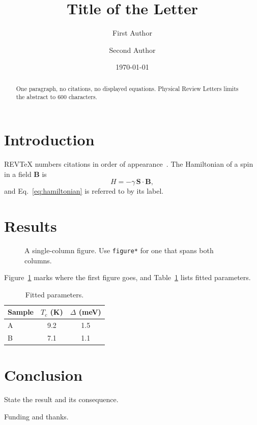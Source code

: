 \documentclass[aps,prl,reprint,superscriptaddress]{revtex4-2}
\begin{document}
\title{Title of the Letter}

\author{First Author}

\author{Second Author}

\date{\today}

\begin{abstract}
One paragraph, no citations, no displayed equations. Physical Review Letters
limits the abstract to 600 characters.
\end{abstract}

\maketitle

\section{Introduction}

REVTeX numbers citations in order of appearance~\cite{einstein1905}. The
Hamiltonian of a spin in a field $\bm{B}$ is
\begin{equation}
  H = -\gamma\, \bm{S} \cdot \bm{B},
  \label{eq:hamiltonian}
\end{equation}
and Eq.~\eqref{eq:hamiltonian} is referred to by its label.

\section{Results}

\begin{figure}[b]
  \caption{A single-column figure. Use \texttt{figure*} for one that spans
  both columns.}
  \label{fig:example}
\end{figure}

Figure~\ref{fig:example} marks where the first figure goes, and
Table~\ref{tab:values} lists fitted parameters.

\begin{table}[b]
  \caption{Fitted parameters.}
  \label{tab:values}
  \begin{ruledtabular}
    \begin{tabular}{lcc}
      Sample & $T_c$ (K) & $\Delta$ (meV) \\
      \hline
      A & 9.2 & 1.5 \\
      B & 7.1 & 1.1 \\
    \end{tabular}
  \end{ruledtabular}
\end{table}

\section{Conclusion}

State the result and its consequence.

\begin{acknowledgments}
Funding and thanks.
\end{acknowledgments}


\end{document}
